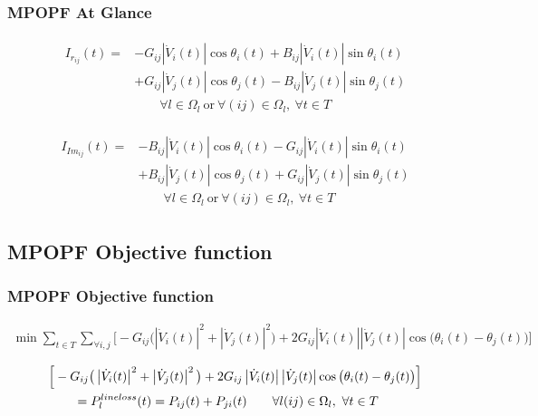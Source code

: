 \documentclass[
	11pt, %
	aspectratio=169, %
]{beamer}
\begin{document}
\begin{frame}
    \frametitle{MPOPF At Glance}
    
    \begin{align*}
        \begin{split}
            I_{r_{ij}}(t) = &-G_{ij}\left\lvert \dot{V}_{i}(t) \right\rvert \cos{\theta_{i}(t)} + B_{ij}\left\lvert \dot{V}_{i}(t) \right\rvert \sin{\theta_{i}(t)} \\
                    &+ G_{ij}\left\lvert \dot{V}_{j}(t) \right\rvert \cos{\theta_{j}(t)} - B_{ij}\left\lvert \dot{V}_{j}(t) \right\rvert \sin{\theta_{j}(t)} \\
            &\qquad \forall l \in \Omega_{l} \ \text{or} \ \forall (ij) \in \Omega_{l},\ \forall t \in T
        \end{split}
    \end{align*}

    \begin{align*}
        \begin{split}
            I_{Im_{ij}}(t) = &-B_{ij}\left\lvert \dot{V}_{i}(t) \right\rvert \cos{\theta_{i}(t)} - G_{ij}\left\lvert \dot{V}_{i}(t) \right\rvert \sin{\theta_{i}(t)} \\
            &+ B_{ij}\left\lvert \dot{V}_{j}(t) \right\rvert \cos{\theta_{j}(t)} + G_{ij}\left\lvert \dot{V}_{j}(t) \right\rvert \sin{\theta_{j}(t)} \\
            &\qquad \forall l \in \Omega_{l} \ \text{or} \ \forall (ij) \in \Omega_{l},\ \forall t \in T
        \end{split}
    \end{align*}

\end{frame}

\subsection{MPOPF Objective function}

\begin{frame}
    \frametitle{MPOPF Objective function}
    \label{frame:MPOFP_objfunc}
    \begin{align}
    \label{eq:Mobj}
        \min \sum_{t \in T} \sum_{\forall i,j} \Big[ -G_{ij}\big(\left|\dot{V}_{i}(t)\right|^2 + \left|\dot{V}_{j}(t)\right|^2\big) + 2G_{ij}\left|\dot{V}_{i}(t)\right|\left|\dot{V}_{j}(t)\right|\cos\big(\theta_{i}(t)-\theta_{j}(t)\big) \Big]
    \end{align}

    \begin{align}
    \label{eq:Mexpr_loss}
        &\Big[ -G_{ij}\big(\left|\dot{V}_{i}(t)\right|^2 + \left|\dot{V}_{j}(t)\right|^2\big) + 2G_{ij}\left|\dot{V}_{i}(t)\right|\left|\dot{V}_{j}(t)\right|\cos\big(\theta_{i}(t)-\theta_{j}(t)\big) \Big] \notag \\
        &\qquad = P_{l}^{line loss}(t) = P_{ij}(t) + P_{ji}(t) \qquad \forall l(ij) \in \Omega_{l},\ \forall t \in T
    \end{align}

\end{frame}
\end{document}
